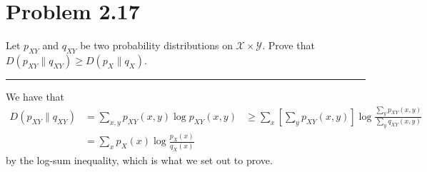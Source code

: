 \documentclass{article}
\newcommand{\horline}
           {\begin{center}
              \noindent\rule{8cm}{0.4pt}
            \end{center}}
\begin{document}
\section*{Problem 2.17}
Let $p_{XY}$ and $q_{XY}$ be two probability distributions on 
$\mathcal{X} \times \mathcal{Y}$. Prove that 
$D(p_{XY} \| q_{XY}) \geq D(p_X \| q_X)$.
\horline
We have that
\begin{align*}
  D(p_{XY} \| q_{XY}) & = \sum_{x,y} p_{XY}(x, y) \log p_{XY}(x, y)
                      & \geq \sum_x \left[\sum_y p_{XY}(x, y)\right]
                      \log \frac{\sum_y p_{XY}(x,y)}{\sum_y q_{XY}(x,y)} \\
                      & = \sum_x p_X(x) \log \frac{p_X(x)}{q_X(x)}
\end{align*}
by the log-sum inequality, which is what we set out to prove.
\end{document}
